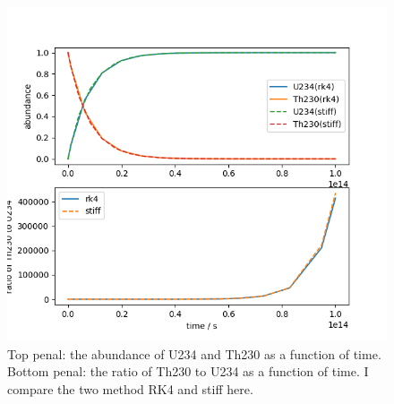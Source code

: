 \documentclass[showpacs, oneside, onecolumn, prl, amsmath, amssymb, nofootinbib, superscriptaddress, notitlepage]{revtex4-1}
\newcommand\bfig{\begin{figure}}
\newcommand\efig{\end{figure}}
\begin{document}
\bfig
	\centering
	\includegraphics[scale=1]{2-3-3.png}
	\caption{Top penal: the abundance of U234 and Th230 as a function of time. Bottom penal: the ratio of Th230 to U234 as a function of time. I compare the two method RK4 and stiff here.}
	\label{2-3-3}
\efig
\end{document}
